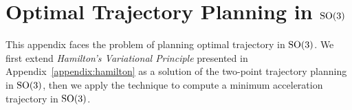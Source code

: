 \chapter{Optimal Trajectory Planning in $\mathrm{SO}(3)$ \label{appendix:optimal_planning_so3}} 
This appendix faces the problem of planning optimal trajectory in $\mathrm{SO}(3)$. We first extend \emph{Hamilton's Variational Principle} presented in Appendix~\ref{appendix:hamilton} as a solution of the two-point trajectory planning in $\mathrm{SO}(3)$, then we apply the technique to compute a minimum acceleration trajectory in $\mathrm{SO}(3)$.


